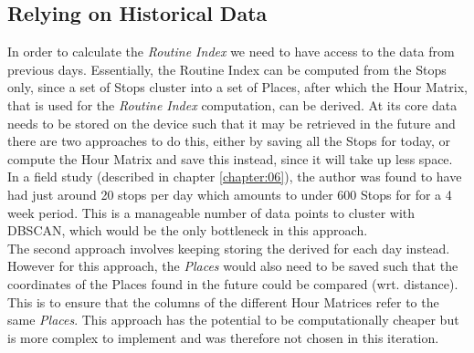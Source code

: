 \subsection{Relying on Historical Data}
In order to calculate the \textit{Routine Index} we need to have access to the data from previous days. Essentially, the Routine Index can be computed from the Stops only, since a set of Stops cluster into a set of Places, after which the Hour Matrix, that is used for the \textit{Routine Index} computation, can be derived. At its core data needs to be stored on the device such that it may be retrieved in the future and there are two approaches to do this, either by saving all the Stops for today, or compute the Hour Matrix and save this instead, since it will take up less space. In a field study (described in chapter \ref{chapter:06}), the author was found to have had just around 20 stops per day which amounts to under 600 Stops for for a 4 week period. This is a manageable number of data points to cluster with DBSCAN, which would be the only bottleneck in this approach.\\

The second approach involves keeping storing the derived  for each day instead. However for this approach, the \textit{Places} would also need to be saved such that the coordinates of the Places found in the future could be compared (wrt. distance). This is to ensure that the columns of the different Hour Matrices refer to the same \textit{Places}. This approach has the potential to be computationally cheaper but is more complex to implement and was therefore not chosen in this iteration.